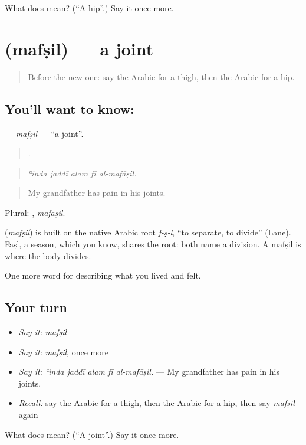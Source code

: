 \begin{tcolorbox}[breakable,colback=teal!4,colframe=teal!35!black,title={Before you move on}]
What does  mean? (\textquotedblleft{}A hip\textquotedblright{}.) Say it once more.
\end{tcolorbox}
\section[\texorpdfstring{\ar{مفصل} (mafṣil)}{مفصل (mafṣil)}]{ (mafṣil) — a joint}

\label{lesson:AR-C505-mafsil}



\begin{quote}
Before the new one: say the Arabic for a thigh, then the Arabic for a hip.
\end{quote}

\subsection*{You'll want to know: }
\textbf{} — \emph{mafṣil} — \textquotedblleft{}a joint\textquotedblright{}.

\begin{quote}
    .
\end{quote}

\begin{quote}
\emph{ʿinda jaddī alam fī al-mafāṣil.}
\end{quote}

\begin{quote}
My grandfather has pain in his joints.
\end{quote}

Plural: , \emph{mafāṣil}.

\begin{cousinweb}
\textbf{} (\emph{mafṣil}) is built on the native Arabic root \emph{f-ṣ-l}, \textquotedblleft{}to separate, to divide\textquotedblright{} (Lane). Faṣl, a season, which you know, shares the root: both name a division. A mafṣil is where the body divides.
\end{cousinweb}

\begin{grammarlens}[title={What you've built}]
One more word for describing what you lived and felt.
\end{grammarlens}

\subsection*{Your turn}
\begin{itemize}
\raggedright
  \item \emph{Say it:} \emph{mafṣil}
  \item \emph{Say it:} \emph{mafṣil}, once more
  \item \emph{Say it:} \emph{ʿinda jaddī alam fī al-mafāṣil.} — My grandfather has pain in his joints.
  \item \emph{Recall:} say the Arabic for a thigh, then the Arabic for a hip, then say \emph{mafṣil} again
\end{itemize}

\begin{tcolorbox}[breakable,colback=teal!4,colframe=teal!35!black,title={Before you move on}]
What does  mean? (\textquotedblleft{}A joint\textquotedblright{}.) Say it once more.
\end{tcolorbox}
